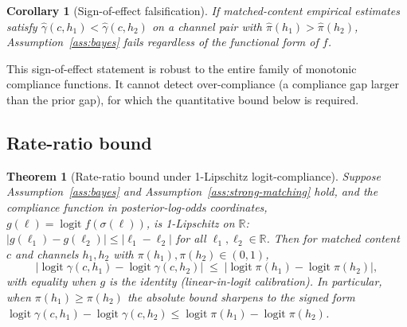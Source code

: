 \documentclass[11pt]{article}
\newtheorem{theorem}{Theorem}
\newtheorem{corollary}{Corollary}
\theoremstyle{definition}
\theoremstyle{remark}
\begin{document}
\begin{corollary}[Sign-of-effect falsification]
\label{cor:sign-falsification}
If matched-content empirical estimates satisfy $\hat\gamma(c, h_1) < \hat\gamma(c, h_2)$
on a channel pair with $\hat\pi(h_1) > \hat\pi(h_2)$, Assumption~\ref{ass:bayes} fails
regardless of the functional form of $f$.
\end{corollary}

This sign-of-effect statement is robust to the entire family of monotonic compliance
functions. It cannot detect over-compliance (a compliance gap larger than the prior
gap), for which the quantitative bound below is required.

\subsection{Rate-ratio bound}

\begin{theorem}[Rate-ratio bound under 1-Lipschitz logit-compliance]
\label{thm:rate-ratio}
Suppose Assumption~\ref{ass:bayes} and Assumption~\ref{ass:strong-matching} hold,
and the compliance function in posterior-log-odds coordinates,
$g(\ell) = \operatorname{logit} f(\sigma(\ell))$, is 1-Lipschitz on $\mathbb{R}$:
$|g(\ell_1) - g(\ell_2)| \le |\ell_1 - \ell_2|$ for all $\ell_1, \ell_2 \in \mathbb{R}$.
Then for matched content $c$ and channels $h_1, h_2$ with $\pi(h_1), \pi(h_2) \in (0,1)$,
\begin{equation}
\label{eq:rate-ratio-bound}
\bigl|\operatorname{logit} \gamma(c, h_1) - \operatorname{logit} \gamma(c, h_2)\bigr|
\;\le\; \bigl|\operatorname{logit} \pi(h_1) - \operatorname{logit} \pi(h_2)\bigr|,
\end{equation}
with equality when $g$ is the identity (linear-in-logit calibration). In particular,
when $\pi(h_1) \ge \pi(h_2)$ the absolute bound sharpens to the signed form
$\operatorname{logit} \gamma(c, h_1) - \operatorname{logit} \gamma(c, h_2) \le
\operatorname{logit} \pi(h_1) - \operatorname{logit} \pi(h_2)$.
\end{theorem}
\end{document}
